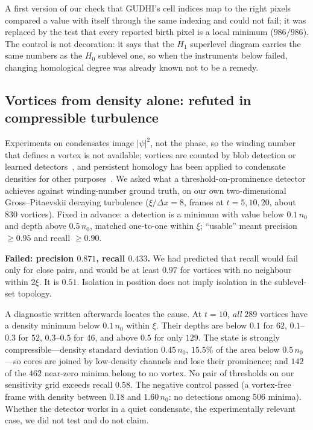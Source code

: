 \documentclass[11pt,a4paper]{article}
\begin{document}
A first version of our check that GUDHI's cell indices map to the right pixels compared a value with
itself through the same indexing and could not fail; it was replaced by the test that every reported
birth pixel is a local minimum ($986/986$). The control is not decoration: it says that the $H_1$
superlevel diagram carries the same numbers as the $H_0$ sublevel one, so when the instruments below
failed, changing homological degree was already known not to be a remedy.

\subsection{Vortices from density alone: refuted in compressible turbulence}

Experiments on condensates image $|\psi|^2$, not the phase, so the winding number that defines a vortex
is not available; vortices are counted by blob detection or learned detectors~\cite{Metz2021}, and
persistent homology has been applied to condensate densities for other
purposes~\cite{Spitz2021,Leykam2022}. We asked what a threshold-on-prominence detector achieves against
winding-number ground truth, on our own two-dimensional Gross--Pitaevskii decaying turbulence
($\xi/\Delta x=8$, frames at $t=5,10,20$, about $830$ vortices). Fixed in advance: a detection is a minimum
with value below $0.1\,n_0$ and depth above $0.5\,n_0$, matched one-to-one within $\xi$; ``usable'' meant
precision $\ge0.95$ and recall $\ge0.90$.

\begin{failbox}
\textbf{Failed: precision $0.871$, recall $0.433$.} We had predicted that recall would fail only for
close pairs, and would be at least $0.97$ for vortices with no neighbour within $2\xi$. It is $0.51$.
Isolation in position does not imply isolation in the sublevel-set topology.
\end{failbox}

A diagnostic written afterwards locates the cause. At $t=10$, \emph{all} $289$ vortices have a density
minimum below $0.1\,n_0$ within $\xi$. Their depths are below $0.1$ for $62$, $0.1$--$0.3$ for $52$,
$0.3$--$0.5$ for $46$, and above $0.5$ for only $129$. The state is strongly compressible---density
standard deviation $0.45\,n_0$, $15.5\%$ of the area below $0.5\,n_0$---so cores are joined by low-density
channels and lose their prominence; and $142$ of the $462$ near-zero minima belong to no vortex. No pair
of thresholds on our sensitivity grid exceeds recall $0.58$. The negative control passed (a vortex-free
frame with density between $0.18$ and $1.60\,n_0$: no detections among $506$ minima). Whether the detector
works in a quiet condensate, the experimentally relevant case, we did not test and do not claim.
\end{document}

